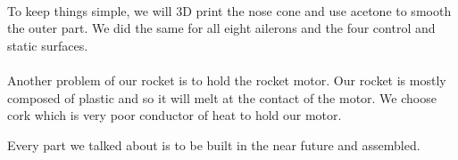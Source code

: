 \paragraph{}
To keep things simple, we will 3D print the nose cone and use acetone to smooth
the outer part. We did the same for all eight ailerons and the four control and
static surfaces.

\paragraph{}
Another problem of our rocket is to hold the rocket motor. Our rocket is mostly
composed of plastic and so it will melt at the contact of the motor. We choose
cork which is very poor conductor of heat to hold our motor.

Every part we talked about is to be built in the near future and assembled.
